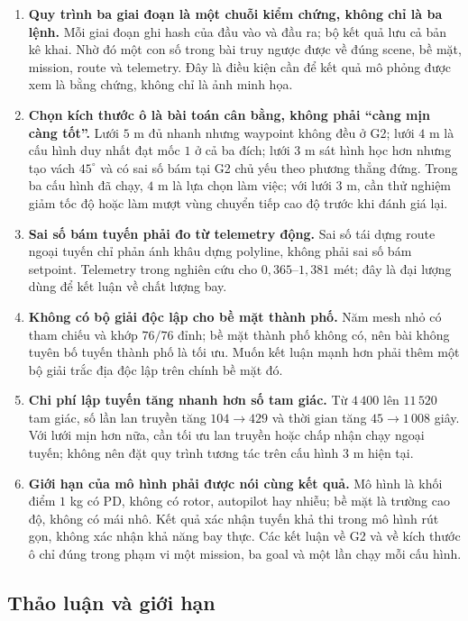 \begin{enumerate}
  \item \textbf{Quy trình ba giai đoạn là một chuỗi kiểm chứng, không chỉ là ba
    lệnh.} Mỗi giai đoạn ghi hash của đầu vào và đầu ra; bộ kết quả lưu cả bản kê
    khai. Nhờ đó một con số trong bài truy ngược được về đúng scene, bề mặt,
    mission, route và telemetry. Đây là điều kiện cần để kết quả mô phỏng được
    xem là bằng chứng, không chỉ là ảnh minh họa.
  \item \textbf{Chọn kích thước ô là bài toán cân bằng, không phải ``càng mịn càng
    tốt''.} Lưới $5$ m đủ nhanh nhưng waypoint không đều ở G2; lưới $4$ m là cấu
    hình duy nhất đạt mốc $1$ ở cả ba đích; lưới $3$ m sát hình học hơn nhưng tạo
    vách $45^\circ$ và có sai số bám tại G2 chủ yếu theo phương
    thẳng đứng. Trong ba cấu hình đã chạy, $4$ m là lựa chọn
    làm việc; với lưới $3$ m, cần thử nghiệm giảm tốc độ hoặc
    làm mượt vùng chuyển tiếp cao độ trước khi đánh giá lại.
  \item \textbf{Sai số bám tuyến phải đo từ telemetry động.} Sai số tái dựng route
    ngoại tuyến chỉ phản ánh khâu dựng polyline, không phải sai số bám setpoint.
    Telemetry trong nghiên cứu cho $0{,}365$--$1{,}381$ mét; đây là đại lượng dùng
    để kết luận về chất lượng bay.
  \item \textbf{Không có bộ giải độc lập cho bề mặt thành phố.} Năm mesh nhỏ có
    tham chiếu và khớp $76/76$ đỉnh; bề mặt thành phố không có, nên bài không
    tuyên bố tuyến thành phố là tối ưu. Muốn kết luận mạnh hơn phải thêm một bộ
    giải trắc địa độc lập trên chính bề mặt đó.
  \item \textbf{Chi phí lập tuyến tăng nhanh hơn số tam giác.} Từ $4\,400$ lên
    $11\,520$ tam giác, số lần lan truyền tăng $104\to429$ và thời gian tăng
    $45\to1\,008$ giây. Với lưới mịn hơn nữa, cần tối ưu lan truyền hoặc chấp nhận
    chạy ngoại tuyến; không nên đặt quy trình tương tác trên cấu hình $3$ m hiện tại.
  \item \textbf{Giới hạn của mô hình phải được nói cùng kết quả.} Mô hình là khối
    điểm $1$ kg có PD, không có rotor, autopilot hay nhiễu; bề mặt là trường cao
    độ, không có mái nhô. Kết quả xác nhận tuyến khả thi trong mô hình rút gọn,
    không xác nhận khả năng bay thực. Các kết luận về G2 và về kích thước ô chỉ
    đúng trong phạm vi một mission, ba goal và một lần chạy mỗi cấu hình.
\end{enumerate}

\subsection{Thảo luận và giới hạn}\label{sec:gazebo-limits}

